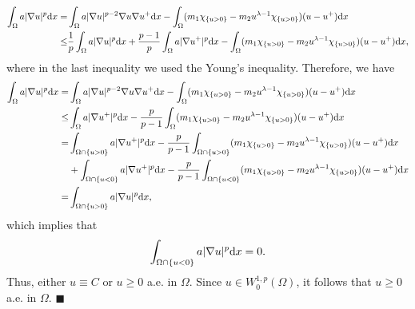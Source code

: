 \documentclass[onecolumn]{autart}
\newenvironment{proof}{{\it Proof: \enspace}}{\hfill $\blacksquare$\par}
\begin{document}
\begin{proof}
\begin{align*}
			\int_{\Omega}a|\nabla u|^{p } \mathrm{d}x=& \int_{\Omega}a|\nabla u|^{p-2}\nabla u  \nabla u^+ \mathrm{d}x -\int_{\Omega} (m_1 \chi_{\{u>0\}} - m_2 u^{\lambda - 1} \chi_{\{u > 0\}}  )(u-u^+) \mathrm{d}x \notag\\
			\leq & \frac{1}{p}\int_{\Omega}a|\nabla u|^{p }  \mathrm{d}x + \frac{p-1}{p}\int_{\Omega}a|\nabla u^+|^{p }  \mathrm{d}x
			-\int_{\Omega} (m_1 \chi_{\{u>0\}} - m_2 u^{\lambda - 1} \chi_{\{u > 0\}}  )(u-u^+) \mathrm{d}x,
		\end{align*}
		where in the last inequality we used the Young's inequality. Therefore, we have
		\begin{align*}
			\int_{\Omega}a|\nabla u|^{p } \mathrm{d}x=& \int_{\Omega}a|\nabla u|^{p-2}\nabla u  \nabla u^+ \mathrm{d}x -\int_{\Omega} (m_1 \chi_{\{u>0\}} - m_2 u^{\lambda - 1} \chi_{\{u > 0\}}  )(u-u^+) \mathrm{d}x \notag\\
			\leq &  \int_{\Omega}a|\nabla u^+|^{p }  \mathrm{d}x
			-\frac{p}{p-1}\int_{\Omega} (m_1 \chi_{\{u>0\}} - m_2 u^{\lambda - 1} \chi_{\{u > 0\}}  )(u-u^+) \mathrm{d}x \notag\\
			= &  \int_{\Omega \cap \{u>0\} }a|\nabla u^+|^{p }  \mathrm{d}x
			-\frac{p}{p-1}\int_{\Omega \cap \{u>0\}} (m_1 \chi_{\{u>0\}} - m_2 u^{\lambda - 1} \chi_{\{u > 0\}}  )(u-u^+) \mathrm{d}x\notag\\
			& +  \int_{\Omega \cap \{u<0\}}a|\nabla u^+|^{p }  \mathrm{d}x
			-\frac{p}{p-1}\int_{\Omega \cap \{u<0\}} (m_1 \chi_{\{u>0\}} - m_2 u^{\lambda - 1} \chi_{\{u > 0\}}  )(u-u^+) \mathrm{d}x \notag\\
			= &  \int_{\Omega \cap \{u>0\} }a|\nabla u|^{p }  \mathrm{d}x,
		\end{align*}
		which implies that
		\begin{align}
			\int_{\Omega \cap \{u<0\} }a|\nabla u|^{p }  \mathrm{d}x = 0.   \notag
		\end{align}
		Thus, either $u \equiv C$ or $u \geq 0$ a.e. in $\Omega$. Since $u \in W^{1,p}_0(\Omega)$, it follows that $u \geq 0$ a.e. in $\Omega$.
	\end{proof}
	
\end{document}
